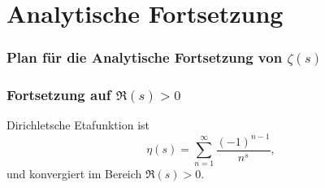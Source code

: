 \documentclass[ngerman, aspectratio=169]{beamer}
\begin{document}
    \section{Analytische Fortsetzung}
    \begin{frame}
        \frametitle{Plan für die Analytische Fortsetzung von $\zeta(s)$}
        \begin{center}
            
        \end{center}
    \end{frame}
    \begin{frame}
        \frametitle{Fortsetzung auf $\Re(s) > 0$}
        Dirichletsche Etafunktion ist
        \begin{equation*}\label{zeta:equation:eta}
            \eta(s)
            =
            \sum_{n=1}^{\infty}
            \frac{(-1)^{n-1}}{n^s},
        \end{equation*}
        und konvergiert im Bereich $\Re(s) > 0$.
    \end{frame}

% 
% 
% 
\end{document}

